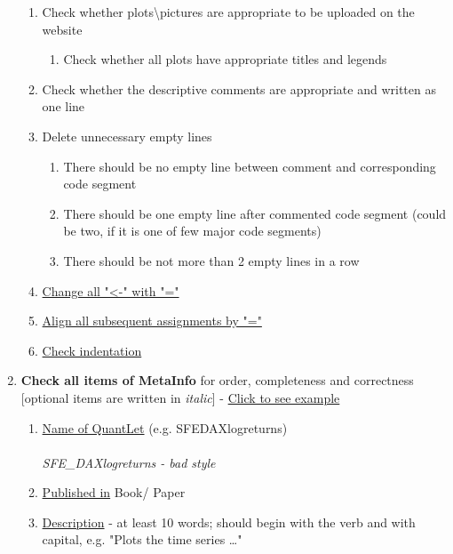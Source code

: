 \documentclass{article}
\begin{document}
\begin{enumerate}[label*=\arabic*.]
\begin {enumerate}[label*=\arabic*.]
\begin{enumerate}[label*=\arabic*.]
				\item Check whether all lines of code are still written properly
				\item Check that the code still works 											properly	
			\end{enumerate}
		\item Check whether plots\textbackslash pictures are appropriate to be uploaded on the website
			\begin{enumerate}[label*=\arabic*.]
				\item Check whether all plots have appropriate titles and legends
			\end{enumerate}
		\item Check whether the descriptive comments are appropriate and written as one line
		\item Delete unnecessary empty lines
		\begin{enumerate}[label*=\arabic*.]
				\item There should be no empty line between comment and corresponding code segment
				\item There should be one empty line after commented code segment (could be two, if it is one of few major code segments)
				\item There should be not more than 2 empty lines in a row
			\end{enumerate}
		\item \label{all-equal-ini}\hyperref[all-equal]{Change all "\textless -" with "="}
		\item \label{align-assign-ini}\hyperref[align-assign]{Align all subsequent assignments by "="}
		\item \label{indentation-ini}\hyperref[indentation]{Check indentation}
	\end{enumerate}
	\item \textbf{Check all items of MetaInfo} for order, completeness and correctness [optional items are written 	in \textit{italic}] - \label{MetaInfo-ini}\hyperref[MetaInfo]{Click to see example}
	\begin{enumerate}[label*=\arabic*.]
		\item \underline{Name of QuantLet} (e.g. SFEDAXlogreturns) \\\\ {\it SFE\_DAXlogreturns - bad style}
		\item \underline{Published in} Book/ Paper
		\item \underline{Description} - at least 10 words; should begin with the verb and with capital, e.g. "Plots the time series \dots"

\end{enumerate}
\end{enumerate}
\end{document}
